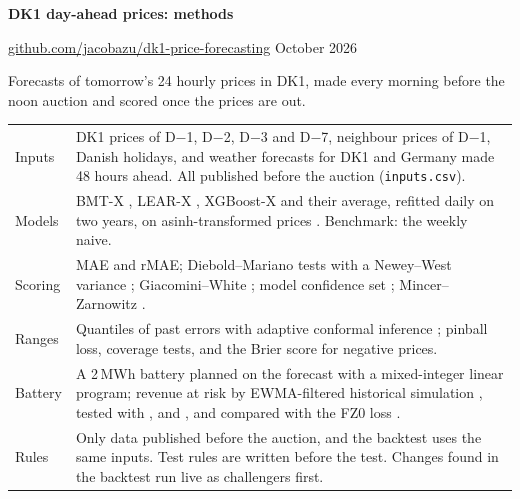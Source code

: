 \documentclass[11pt,a4paper]{article}
\begin{document}
{\sffamily\bfseries\Large DK1 day-ahead prices: methods}\par
\href{https://github.com/jacobazu/dk1-price-forecasting}{github.com/jacobazu/dk1-price-forecasting} \textperiodcentered{} October 2026

Forecasts of tomorrow's 24 hourly prices in DK1, made every morning before the noon auction and scored once the prices are out.

\begin{center}\small
\begin{tabularx}{\linewidth}{@{}lL@{}}
\toprule
Inputs & DK1 prices of D$-$1, D$-$2, D$-$3 and D$-$7, neighbour prices of D$-$1, Danish holidays, and weather forecasts for DK1 and Germany made 48 hours ahead. All published before the auction (\texttt{inputs.csv}). \\
Models & BMT-X \citep{kapetanios2026}, LEAR-X \citep{lago2021}, XGBoost-X \citep{chen2016} and their average, refitted daily on two years, on asinh-transformed prices \citep{uniejewski2018}. Benchmark: the weekly naive. \\
Scoring & MAE and rMAE; Diebold--Mariano tests with a Newey--West variance \citep{diebold1995,newey1987}; Giacomini--White \citep{giacomini2006}; model confidence set \citep{hansen2011}; Mincer--Zarnowitz \citep{mincer1969}. \\
Ranges & Quantiles of past errors with adaptive conformal inference \citep{gibbs2021}; pinball loss, coverage tests, and the Brier score for negative prices. \\
Battery & A 2\,MWh battery planned on the forecast with a mixed-integer linear program; revenue at risk by EWMA-filtered historical simulation \citep{hull1998}, tested with \citet{kupiec1995}, \citet{christoffersen1998} and \citet{acerbi2014}, and compared with the FZ0 loss \citep{patton2019}. \\
Rules & Only data published before the auction, and the backtest uses the same inputs. Test rules are written before the test. Changes found in the backtest run live as challengers first. \\
\bottomrule
\end{tabularx}
\end{center}
\end{document}
